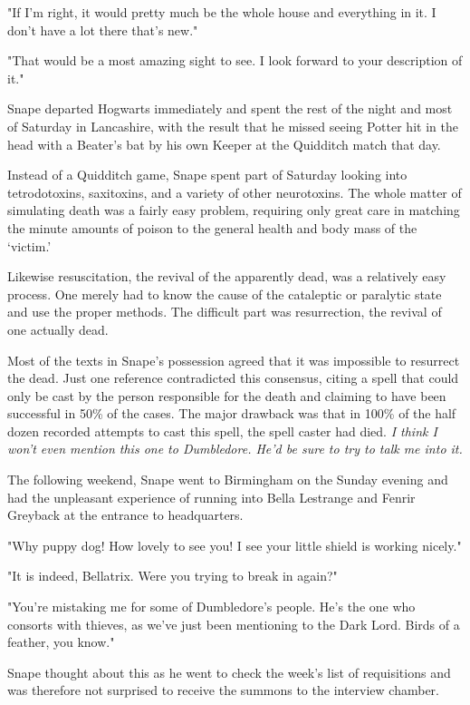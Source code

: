 "If I'm right, it would pretty much be the whole house and everything in it. I don't have a lot there that's new."

"That would be a most amazing sight to see. I look forward to your description of it."

Snape departed Hogwarts immediately and spent the rest of the night and most of Saturday in Lancashire, with the result that he missed seeing Potter hit in the head with a Beater's bat by his own Keeper at the Quidditch match that day.

Instead of a Quidditch game, Snape spent part of Saturday looking into tetrodotoxins, saxitoxins, and a variety of other neurotoxins. The whole matter of simulating death was a fairly easy problem, requiring only great care in matching the minute amounts of poison to the general health and body mass of the `victim.'

Likewise resuscitation, the revival of the apparently dead, was a relatively easy process. One merely had to know the cause of the cataleptic or paralytic state and use the proper methods. The difficult part was resurrection, the revival of one actually dead.

Most of the texts in Snape's possession agreed that it was impossible to resurrect the dead. Just one reference contradicted this consensus, citing a spell that could only be cast by the person responsible for the death and claiming to have been successful in 50\% of the cases. The major drawback was that in 100\% of the half dozen recorded attempts to cast this spell, the spell caster had died. \emph{I think I won't even mention this one to Dumbledore. He'd be sure to try to talk me into it.}

The following weekend, Snape went to Birmingham on the Sunday evening and had the unpleasant experience of running into Bella Lestrange and Fenrir Greyback at the entrance to headquarters.

"Why puppy dog! How lovely to see you! I see your little shield is working nicely."

"It is indeed, Bellatrix. Were you trying to break in again?"

"You're mistaking me for some of Dumbledore's people. He's the one who consorts with thieves, as we've just been mentioning to the Dark Lord. Birds of a feather, you know."

Snape thought about this as he went to check the week's list of requisitions and was therefore not surprised to receive the summons to the interview chamber.

